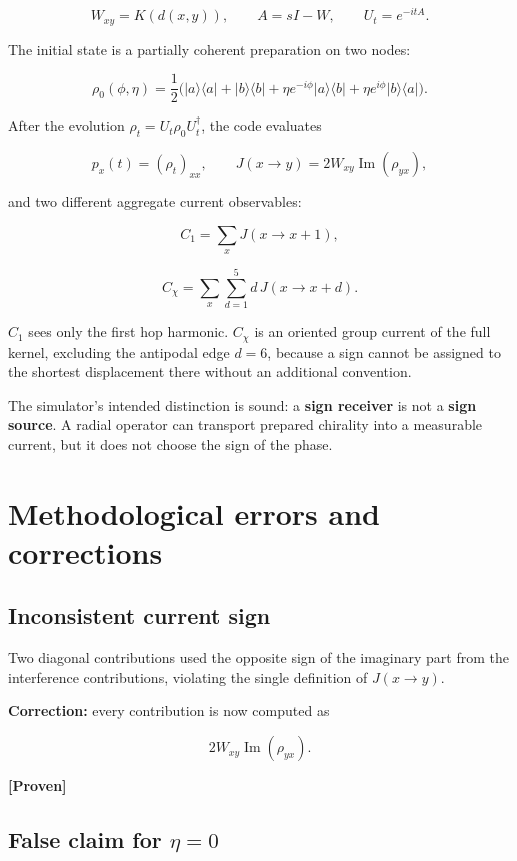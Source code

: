 \documentclass[11pt,a4paper,openany]{report}
\newcommand{\statusProven}{\textcolor{fingreen}{[Proven]}}
\begin{document}
\[
W_{xy}=K(d(x,y)),\qquad
A=sI-W,\qquad
U_t=e^{-itA}.
\]

The initial state is a partially coherent preparation on two nodes:

\[
\rho_0(\phi,\eta)
=\frac12\Big(
|a\rangle\langle a|+|b\rangle\langle b|
+\eta e^{-i\phi}|a\rangle\langle b|
+\eta e^{i\phi}|b\rangle\langle a|
\Big).
\]

After the evolution \(\rho_t=U_t\rho_0U_t^\dagger\), the code evaluates

\[
p_x(t)=(\rho_t)_{xx},
\qquad
J(x\to y)=2W_{xy}\operatorname{Im}(\rho_{yx}),
\]

and two different aggregate current observables:

\[
C_1=\sum_xJ(x\to x+1),
\]

\[
C_\chi=\sum_x\sum_{d=1}^{5}d\,J(x\to x+d).
\]

\(C_1\) sees only the first hop harmonic. \(C_\chi\) is an oriented group current of the full kernel, excluding the antipodal edge \(d=6\), because a sign cannot be assigned to the shortest displacement there without an additional convention.

The simulator's intended distinction is sound: a \textbf{sign receiver} is not a \textbf{sign source}. A radial operator can transport prepared chirality into a measurable current, but it does not choose the sign of the phase.

\chapter{Methodological errors and corrections}

\section{Inconsistent current sign}

Two diagonal contributions used the opposite sign of the imaginary part from the interference contributions, violating the single definition of \(J(x\to y)\).

\textbf{Correction:} every contribution is now computed as

\[
2W_{xy}\operatorname{Im}(\rho_{yx}).
\]

\textbf{\statusProven{}}

\section{\texorpdfstring{False claim for \(\eta=0\)}{False claim for =0}}
\end{document}
